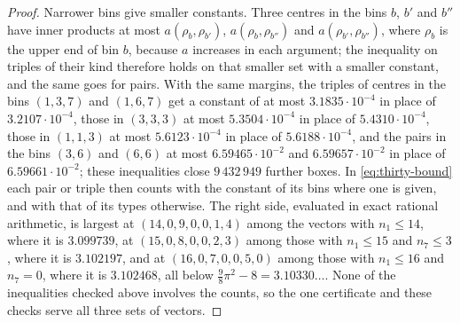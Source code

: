 \documentclass[11pt,reqno]{amsart}
\renewcommand{\_}{\origunderscore\allowbreak}
\numberwithin{equation}{section}
\theoremstyle{plain}
\theoremstyle{definition}
\theoremstyle{remark}
\begin{document}
\begin{proof}
Narrower bins give smaller constants. Three centres in the bins $b$, $b'$ and
$b''$ have inner products at most $a(\rho_b,\rho_{b'})$, $a(\rho_b,\rho_{b''})$
and $a(\rho_{b'},\rho_{b''})$, where $\rho_b$ is the upper end of bin $b$,
because $a$ increases in each argument; the inequality on triples of their kind
therefore holds on that smaller set with a smaller constant, and the same goes
for pairs. With the same margins, the triples of centres in the bins $(1,3,7)$
and $(1,6,7)$ get a constant of at most $3.1835\cdot10^{-4}$ in place of
$3.2107\cdot10^{-4}$, those in $(3,3,3)$ at most $5.3504\cdot10^{-4}$ in place
of $5.4310\cdot10^{-4}$, those in $(1,1,3)$ at most $5.6123\cdot10^{-4}$ in
place of $5.6188\cdot10^{-4}$, and the pairs in the bins $(3,6)$ and $(6,6)$
at most $6.59465\cdot10^{-2}$ and $6.59657\cdot10^{-2}$ in place of
$6.59661\cdot10^{-2}$; these inequalities close $9\,432\,949$ further boxes. In
\eqref{eq:thirty-bound} each pair or triple then counts with the constant of
its bins where one is given, and with that of its types otherwise. The right
side, evaluated in exact rational arithmetic, is largest at
$(14,0,9,0,0,1,4)$ among the vectors with $n_1\le14$, where it is
$3.099739$, at $(15,0,8,0,0,2,3)$ among those with $n_1\le15$ and
$n_7\le3$, where it is $3.102197$, and at $(16,0,7,0,0,5,0)$ among those with
$n_1\le16$ and $n_7=0$, where it is $3.102468$, all below
$\frac98\pi^2-8=3.10330\ldots$. None of the inequalities checked above
involves the counts, so the one certificate and these checks serve all three
sets of vectors.
\end{proof}
\end{document}
